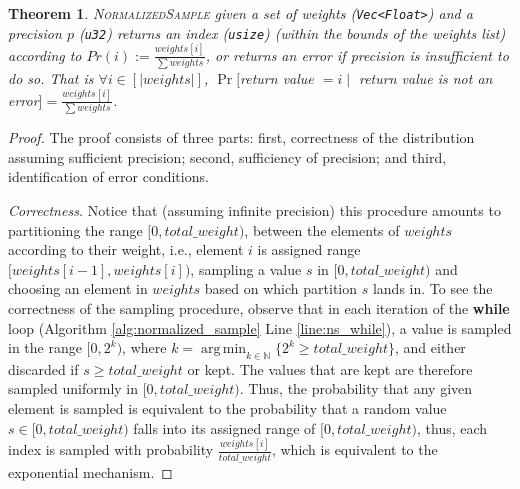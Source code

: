 \documentclass[11pt]{article}
\newtheorem{theorem}{Theorem}[section]
\theoremstyle{definition}
\DeclareMathOperator*{\argmin}{arg\,min}
\newcommand{\unsigned}[1]{{\tt u#1}}
\begin{document}
\begin{theorem}\label{thm:normalizedsample}
\textsc{NormalizedSample} given a set of weights ({\tt Vec<Float>}) and a precision $p$ (\unsigned{32}) returns an index ({\tt usize}) (within the bounds of the weights list) according to $Pr(i) := \frac{weights[i]}{\sum weights}$, or returns an error if precision is insufficient to do so. That is $\forall i \in [|weights|]$, $\Pr[$return value $=i \mid $ return value is not an error$] = \frac{weights[i]}{\sum weights}$.
\end{theorem}
\begin{proof}
The proof consists of three parts: first, correctness of the distribution assuming sufficient precision; second, sufficiency of precision; and %
third, identification of error conditions.

\textit{Correctness.} Notice that (assuming infinite precision) this procedure amounts to partitioning the range $[0,total\_weight)$, between the elements of $weights$ according to their weight, i.e., element $i$ is assigned range $[weights[i-1],weights[i])$, sampling a value $s$ in $[0,total\_weight)$ and choosing an element in $weights$ based on which partition $s$ lands in. 
To see the correctness of the sampling procedure, observe that in each iteration of the  \textbf{while} loop (Algorithm \ref{alg:normalized_sample} Line \ref{line:ns_while}), a value is sampled in the range $[0,2^{k})$, where $k=\argmin_{k \in \mathbb{N}}\{2^k \geq total\_weight\}$, and either discarded if $s\geq total\_weight$ or kept. The values that are kept are therefore sampled uniformly in $[0,total\_weight)$. Thus,
the probability that any given element is sampled is equivalent to the probability that a random value $s \in [0,total\_weight)$ falls into its assigned range of $[0,total\_weight)$, thus, each index is sampled with probability $\frac{weights[i]}{total\_weight}$, which is equivalent to the exponential mechanism. 



\end{proof}
\end{document}
